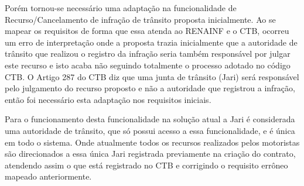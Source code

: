 Porém tornou-se necessário uma adaptação na funcionalidade de Recurso/Cancelamento de infração de trânsito proposta inicialmente. Ao se mapear os requisitos de forma que essa atenda ao RENAINF e o CTB, ocorreu um erro de interpretação onde a proposta trazia inicialmente que a autoridade de trânsito que realizou o registro da infração seria também responsável por julgar este recurso e isto acaba não seguindo totalmente o processo adotado no código CTB. O Artigo 287 do CTB diz que uma junta de trânsito (Jari) será responsável pelo julgamento do recurso proposto e não a autoridade que registrou a infração, então foi necessário esta adaptação nos requisitos iniciais.

Para o funcionamento desta funcionalidade na solução atual a Jari é considerada uma autoridade de trânsito, que só possui acesso a essa funcionalidade, e é única em todo o sistema. Onde atualmente todos os recursos realizados pelos motoristas são direcionados a essa única Jari registrada previamente na criação do contrato, atendendo assim o que está registrado no CTB e corrigindo o requisito errôneo mapeado anteriormente.

